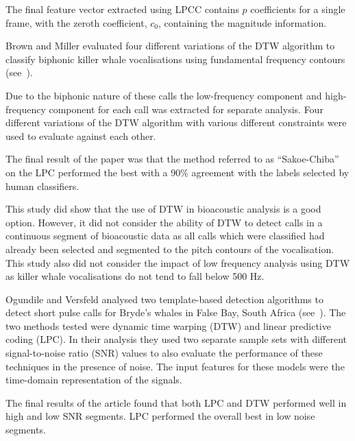 The final feature vector extracted using \acs{LPCC} contains $p$ coefficients for a single frame, with the zeroth coefficient, $c_0$, containing the magnitude information.

\label{sec:similar_studies}

\label{sec:killer-dtw}
Brown and Miller evaluated four different variations of the \ac{DTW} algorithm to classify biphonic killer whale 
vocalisations using fundamental frequency contours (see~\cite{killer-whale}). 

Due to the biphonic nature of these calls the low-frequency component and high-frequency component for each call was extracted for separate analysis. Four different 
variations of the \acs{DTW} algorithm with various different constraints were used to evaluate 
against each other. 

The final result of the paper was that the method referred to as ``Sakoe-Chiba'' on 
the \acs{LPC} performed the best with a 90\% agreement with the labels selected by human 
classifiers. 

This study did show that the use of \acs{DTW} in bioacoustic analysis is 
a good option. However, it did not consider the ability of \acs{DTW} to detect calls 
in a continuous segment of bioacoustic data as all calls which were classified had already 
been selected and segmented to the pitch contours of the vocalisation. This study also did 
not consider the impact of low frequency analysis using \acs{DTW} as killer whale vocalisations 
do not tend to fall below 500 Hz.

\label{sec:bryde-dtw-lpc}

Ogundile and Versfeld analysed two template-based detection algorithms to detect short pulse 
calls for Bryde's whales in False Bay, South Africa (see~\cite{temp-based-bryde}). The two methods tested were dynamic time warping (\acs{DTW}) 
and linear predictive coding (\acs{LPC}). In their analysis they used two separate sample sets with different signal-to-noise ratio (\acs{SNR}) values 
to also evaluate the performance of these techniques in the presence of noise. The input 
features for these models were the time-domain representation of the signals. 

The final results of the article found that both \acs{LPC} and \acs{DTW} performed well in high 
and low \acs{SNR} segments. \acs{LPC} performed the overall best in low noise segments.

